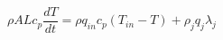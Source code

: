 \documentclass[preview]{standalone}
\begin{document}
\begin{align*}
\rho A L c_p \dfrac{dT}{dt} = \rho q_{in} c_p (T_{in}-T) + \rho_j q_j \lambda_j
\end{align*}
\end{document}
